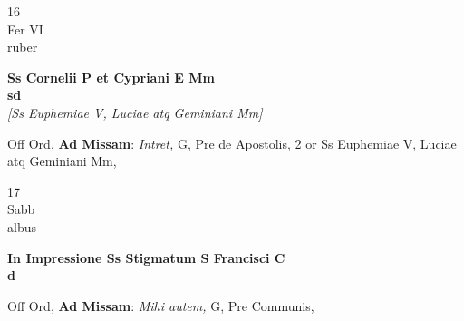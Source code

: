 \documentclass[10pt, openany]{book}
\begin{document}
        \begin{center}
            \begin{minipage}{3.5in}
                \vspace{2em}
                \begin{minipage}{0.5in}
                    {\Huge 16} \\
                    {\normalsize Fer VI} \\
                    {\normalsize ruber}
                \end{minipage}
                \begin{minipage}{3.0in}
                    \textbf{ \large Ss Cornelii P et Cypriani E Mm \\
                    \textnormal{\normalsize sd}} \\ \textit{[Ss Euphemiae V, Luciae atq Geminiani Mm]} \\ 
                \end{minipage}
                \begin{justify}Off Ord, \textbf{Ad Missam}: \textit{Intret,} G, Pre de Apostolis, 2 or Ss Euphemiae V, Luciae atq Geminiani Mm,   
                \end{justify}
            \end{minipage}
        \end{center}
    
        \begin{center}
            \begin{minipage}{3.5in}
                \vspace{2em}
                \begin{minipage}{0.5in}
                    {\Huge 17} \\
                    {\normalsize Sabb} \\
                    {\normalsize albus}
                \end{minipage}
                \begin{minipage}{3.0in}
                    \textbf{ \large In Impressione Ss Stigmatum S Francisci C \\
                    \textnormal{\normalsize d}} \\ 
                \end{minipage}
                \begin{justify}Off Ord, \textbf{Ad Missam}: \textit{Mihi autem,} G, Pre Communis,   
                \end{justify}
            \end{minipage}
        \end{center}
    
\end{document}
